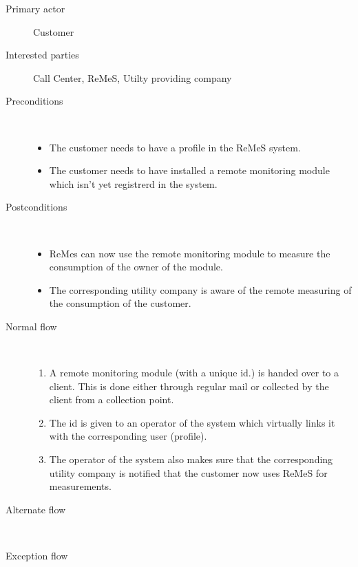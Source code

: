 \begin{description}
	\item[Primary actor] Customer
	\item[Interested parties] Call Center, ReMeS, Utilty providing company
	\item[Preconditions] \ 
	\begin{itemize}
		\item The customer needs to have a profile in the ReMeS system.
		\item The customer needs to have installed a remote monitoring module which
		isn't yet registrerd in the system.
	\end{itemize}
	\item[Postconditions] \ 
	\begin{itemize}
		\item ReMes can now use the remote monitoring module to measure the
		consumption of the owner of the module.
		\item The corresponding utility company is aware of the remote measuring of
		the consumption of the customer.
	\end{itemize}
	\item[Normal flow] \ 
	\begin{enumerate}
	  	\item A remote monitoring module (with a unique id.) is handed over to a
	  	client. This is done either through regular mail or collected by the client
	  	from a collection point.
	  	\item The id is given to an operator of the system which virtually links it
	  	with the corresponding user (profile).
	  	\item The operator of the system also makes sure that the corresponding
	  	utility company is notified that the customer now uses ReMeS for
	  	measurements.
	\end{enumerate}
	\item[Alternate flow] \ 
	\begin{description}
		\item
	\end{description}
	\item[Exception flow] \ 
	\begin{description}
		\item
	\end{description}
\end{description}